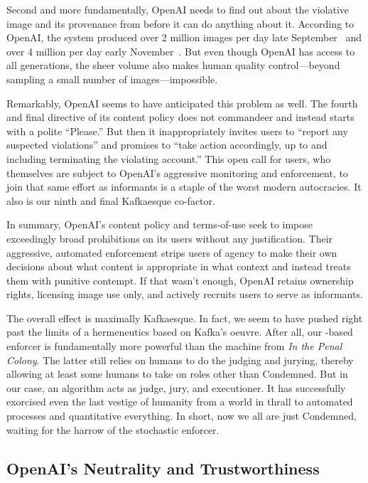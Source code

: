 Second and more fundamentally, OpenAI needs to find out about the violative
image and its provenance from \DALLE before it can do anything about it.
According to OpenAI, the system produced over 2 million images per day late
September~\cite{OpenAI2022a} and over 4 million per day early
November~\cite{OpenAI2022h}. But even though OpenAI has access to all
generations, the sheer volume also makes human quality control---beyond
sampling a small number of images---impossible.

Remarkably, OpenAI seems to have anticipated this problem as well. The fourth
and final directive of its content policy does not commandeer and instead starts
with a polite “Please.” But then it inappropriately invites users to “report any
suspected violations” and promises to “take action accordingly, up to and
including terminating the violating account.” This open call for users, who
themselves are subject to OpenAI's aggressive monitoring and enforcement, to
join that same effort as informants is a staple of the worst modern autocracies.
It also is our ninth and final Kafkaesque co-factor.

In summary, OpenAI's content policy and terms-of-use seek to impose exceedingly
broad prohibitions on its users without any justification. Their aggressive,
automated enforcement strips users of agency to make their own decisions about
what content is appropriate in what context and instead treats them with
punitive contempt. If that wasn't enough, OpenAI retains ownership rights,
licensing image use only, and actively recruits users to serve as informants.

The overall effect is maximally Kafkaesque. In fact, we seem to have pushed
right past the limits of a hermeneutics based on Kafka's oeuvre. After all, our
-based enforcer is fundamentally more powerful than the machine from \emph{In
the Penal Colony}. The latter still relies on humans to do the judging and
jurying, thereby allowing at least some humans to take on roles other than
Condemned. But in our case, an algorithm acts as judge, jury, and executioner.
It has successfully exorcised even the last vestige of humanity from a world in
thrall to automated processes and quantitative everything. In short, now we all
are just Condemned, waiting for the harrow of the stochastic enforcer.


\subsection{OpenAI's Neutrality and Trustworthiness}

